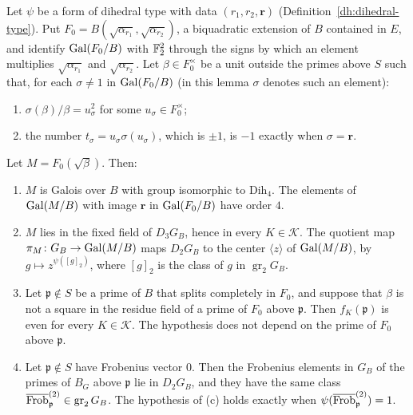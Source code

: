 \begin{lemma}\label{dh:detection}
Let $\psi$ be a form of dihedral type with data $(r_1,r_2,\mathbf r)$
(Definition~\ref{dh:dihedral-type}). Put
$F_0=B(\sqrt{\alpha_{r_1}},\sqrt{\alpha_{r_2}})$, a biquadratic extension of
$B$ contained in $E$, and identify $\operatorname{Gal}(F_0/B)$ with $\mathbb F_2^2$ through the
signs by which an element multiplies $\sqrt{\alpha_{r_1}}$ and
$\sqrt{\alpha_{r_2}}$. Let $\beta\in F_0^\times$ be a unit outside the primes
above $S$ such that, for each $\sigma\ne1$ in $\operatorname{Gal}(F_0/B)$ (in this lemma
$\sigma$ denotes such an element):
\begin{enumerate}
\item[(D1)] $\sigma(\beta)/\beta=u_\sigma^2$ for some $u_\sigma\in F_0^\times$;
\item[(D2)] the number $t_\sigma=u_\sigma\sigma(u_\sigma)$, which is $\pm1$, is
 $-1$ exactly when $\sigma=\mathbf r$.
\end{enumerate}
Let $M=F_0(\sqrt\beta)$. Then:
\begin{enumerate}
\item[(a)] $M$ is Galois over $B$ with group isomorphic to $\mathrm{Dih}_4$.
 The elements of $\operatorname{Gal}(M/B)$ with image $\mathbf r$ in $\operatorname{Gal}(F_0/B)$ have
 order $4$.
\item[(b)] $M$ lies in the fixed field of $D_3G_B$, hence in every
 $K\in\mathcal K$. The quotient map $\pi_M\colon G_B\to\operatorname{Gal}(M/B)$ maps
 $D_2G_B$ to the center $\langle z\rangle$ of $\operatorname{Gal}(M/B)$, by
 $g\mapsto z^{\psi([g]_2)}$, where $[g]_2$ is the class of $g$ in
 $\operatorname{gr}_2G_B$.
\item[(c)] Let $\mathfrak p\notin S$ be a prime of $B$ that splits completely
 in $F_0$, and suppose that $\beta$ is not a square in the residue field of a
 prime of $F_0$ above $\mathfrak p$. Then $f_K(\mathfrak p)$ is even for every
 $K\in\mathcal K$. The hypothesis does not depend on the prime of $F_0$ above
 $\mathfrak p$.
\item[(d)] Let $\mathfrak p\notin S$ have Frobenius vector $0$. Then the
 Frobenius elements in $G_B$ of the primes of $B_G$ above $\mathfrak p$ lie in
 $D_2G_B$, and they have the same class
 $\overline{\operatorname{Frob}}^{(2)}_{\mathfrak p}\in\operatorname{gr}_2G_B$. The
 hypothesis of (c) holds exactly when
 $\psi(\overline{\operatorname{Frob}}^{(2)}_{\mathfrak p})=1$.
\end{enumerate}
\end{lemma}


